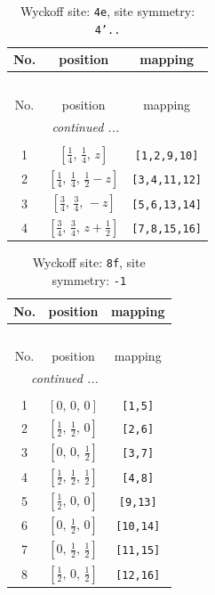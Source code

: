 \documentclass[fleqn,8pt]{jsarticle}
\begin{document}
\renewcommand{\arraystretch}{1.2}
\begin{longtable}{ccc}
\caption{Wyckoff site: {\tt 4e}, site symmetry: {\tt 4'..}}
 \\
 \hline \hline
No. & position & mapping \\ \hline \endfirsthead

\multicolumn{2}{l}{\tablename\ \thetable{}} \\
 \hline \hline
No. & position & mapping \\ \hline \endhead

 \hline \hline
\multicolumn{2}{r}{\footnotesize\it continued ...} \\ \endfoot

 \hline \hline
\multicolumn{2}{r}{} \\ \endlastfoot

1 & $\left[ \frac{1}{4},\, \frac{1}{4},\, z \right]$ & {\tt [1,2,9,10]} \\ \hline
2 & $\left[ \frac{1}{4},\, \frac{1}{4},\, \frac{1}{2} - z \right]$ & {\tt [3,4,11,12]} \\ \hline
3 & $\left[ \frac{3}{4},\, \frac{3}{4},\, - z \right]$ & {\tt [5,6,13,14]} \\ \hline
4 & $\left[ \frac{3}{4},\, \frac{3}{4},\, z + \frac{1}{2} \right]$ & {\tt [7,8,15,16]} \\
\end{longtable}
\renewcommand{\arraystretch}{1.2}
\begin{longtable}{ccc}
\caption{Wyckoff site: {\tt 8f}, site symmetry: {\tt -1}}
 \\
 \hline \hline
No. & position & mapping \\ \hline \endfirsthead

\multicolumn{2}{l}{\tablename\ \thetable{}} \\
 \hline \hline
No. & position & mapping \\ \hline \endhead

 \hline \hline
\multicolumn{2}{r}{\footnotesize\it continued ...} \\ \endfoot

 \hline \hline
\multicolumn{2}{r}{} \\ \endlastfoot

1 & $\left[ 0,\, 0,\, 0 \right]$ & {\tt [1,5]} \\ \hline
2 & $\left[ \frac{1}{2},\, \frac{1}{2},\, 0 \right]$ & {\tt [2,6]} \\ \hline
3 & $\left[ 0,\, 0,\, \frac{1}{2} \right]$ & {\tt [3,7]} \\ \hline
4 & $\left[ \frac{1}{2},\, \frac{1}{2},\, \frac{1}{2} \right]$ & {\tt [4,8]} \\ \hline
5 & $\left[ \frac{1}{2},\, 0,\, 0 \right]$ & {\tt [9,13]} \\ \hline
6 & $\left[ 0,\, \frac{1}{2},\, 0 \right]$ & {\tt [10,14]} \\ \hline
7 & $\left[ 0,\, \frac{1}{2},\, \frac{1}{2} \right]$ & {\tt [11,15]} \\ \hline
8 & $\left[ \frac{1}{2},\, 0,\, \frac{1}{2} \right]$ & {\tt [12,16]} \\
\end{longtable}
\end{document}
